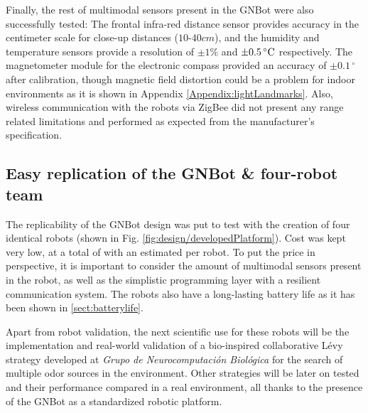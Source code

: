 Finally, the rest of multimodal sensors present in the GNBot were also successfully tested: The frontal infra-red distance sensor provides accuracy in the centimeter scale for close-up distances ($10$-$40cm$), and the humidity and temperature sensors provide a resolution of $\pm1\%$ and $\pm0.5\,^{\circ}{\rm C}$ respectively.
The magnetometer module for the electronic compass provided an accuracy of $\pm0.1\,^{\circ}$ after calibration, though magnetic field distortion could be a problem for indoor environments as it is shown in Appendix \ref{Appendix:lightLandmarks}.
Also, wireless communication with the robots via ZigBee did not present any range related limitations and performed as expected from the manufacturer's specification.



\subsection{Easy replication of the GNBot \& four-robot team}

The replicability of the GNBot design was put to test with the creation of four identical robots (shown in Fig. \ref{fig:design/developedPlatform}). Cost was kept very low, at a total of  with an estimated  per robot.
To put the price in perspective, it is important to consider the amount of multimodal sensors present in the robot, as well as the simplistic programming layer with a resilient communication system. The robots also have a long-lasting battery life as it has been shown in \ref{sect:batterylife}.


Apart from robot validation, the next scientific use for these robots
will be the implementation and real-world validation of a bio-inspired collaborative L\'{e}vy strategy developed at \emph{Grupo de Neurocomputaci\'{o}n Biol\'{o}gica} for the search of multiple odor sources in the environment.
Other strategies will be later on tested and their performance compared in a real environment, all thanks to the presence of the GNBot as a standardized robotic platform.

\newpage 

